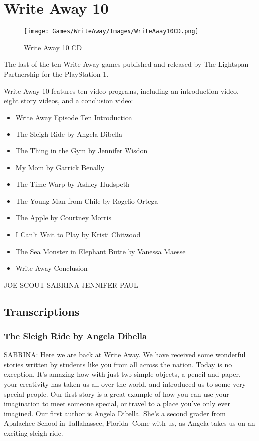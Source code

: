 \chapter{Write Away 10}

\begin{figure}[H]
    \centering
    \texttt{[image: Games/WriteAway/Images/WriteAway10CD.png]}
    \caption{Write Away 10 CD}
\end{figure}

The last of the ten Write Away games published and released by The Lightspan Partnership for the PlayStation 1.

Write Away 10 features ten video programs, including an introduction video, eight story videos, and a conclusion video:

\begin{itemize}
    \item Write Away Episode Ten Introduction
    \item The Sleigh Ride by Angela Dibella
    \item The Thing in the Gym by Jennifer Wisdon
    \item My Mom by Garrick Benally
    \item The Time Warp by Ashley Hudspeth
    \item The Young Man from Chile by Rogelio Ortega
    \item The Apple by Courtney Morris
    \item I Can't Wait to Play by Kristi Chitwood
    \item The Sea Monster in Elephant Butte by Vanessa Maesse
    \item Write Away Conclusion
\end{itemize}

\clearpage
\newpage

JOE
SCOUT
SABRINA
JENNIFER
PAUL

\section{Transcriptions}

\subsection{The Sleigh Ride by Angela Dibella}

SABRINA:
Here we are back at Write Away.
We have received some wonderful stories written by students like you from all across the nation.
Today is no exception.
It's amazing how with just two simple objects, a pencil and paper, your creativity has taken us all over the world, and introduced us to some very special people.
Our first story is a great example of how you can use your imagination to meet someone special, or travel to a place you've only ever imagined.
Our first author is Angela Dibella.
She's a second grader from Apalachee School in Tallahassee, Florida.
Come with us, as Angela takes us on an exciting sleigh ride.

